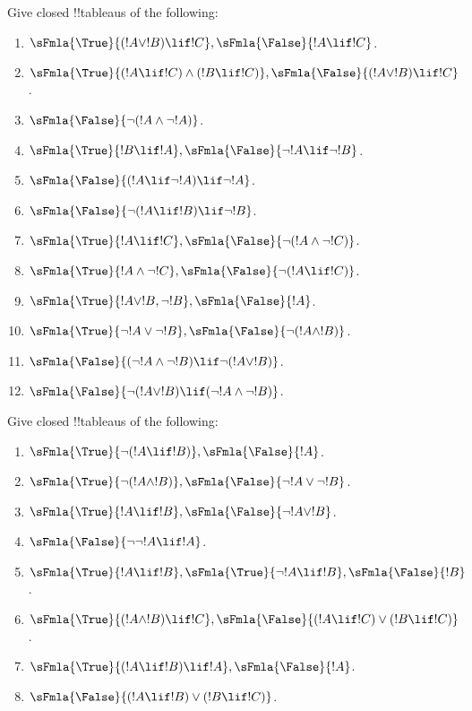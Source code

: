 \documentclass[../../../include/open-logic-section]{subfiles}
\begin{document}
\begin{prob}
Give closed !!{tableau}s of the following:
\begin{enumerate}
\item $\sFmla{\True}{(!A \lor !B) \lif !C}, \sFmla{\False}{!A \lif !C}$.
\item $\sFmla{\True}{(!A \lif !C) \land (!B \lif !C)}, \sFmla{\False}{(!A \lor !B) \lif !C}$.
\item $\sFmla{\False}{\lnot(!A \land \lnot !A)}$.
\item $\sFmla{\True}{!B \lif !A}, \sFmla{\False}{\lnot !A \lif \lnot !B}$.
\item $\sFmla{\False}{(!A \lif \lnot !A) \lif \lnot !A}$.
\item $\sFmla{\False}{\lnot(!A \lif !B) \lif \lnot !B}$.
\item $\sFmla{\True}{!A \lif !C}, \sFmla{\False}{\lnot (!A \land \lnot !C)}$.
\item $\sFmla{\True}{!A \land \lnot !C}, \sFmla{\False}{\lnot (!A \lif !C)}$.
\item $\sFmla{\True}{!A \lor !B, \lnot !B}, \sFmla{\False}{!A}$.
\item $\sFmla{\True}{\lnot !A \lor \lnot !B}, \sFmla{\False}{\lnot(!A \land !B)}$.
\item $\sFmla{\False}{(\lnot !A \land \lnot !B) \lif\lnot(!A \lor !B)}$.
\item $\sFmla{\False}{\lnot(!A \lor !B) \lif (\lnot !A \land \lnot !B)}$.
\end{enumerate}
\end{prob}

\begin{prob}
Give closed !!{tableau}s of the following:
\begin{enumerate}
\item $\sFmla{\True}{\lnot(!A \lif !B)}, \sFmla{\False}{!A}$.
\item $\sFmla{\True}{\lnot(!A \land !B)}, \sFmla{\False}{\lnot !A \lor \lnot !B}$.
\item $\sFmla{\True}{!A \lif !B}, \sFmla{\False}{\lnot !A \lor !B}$.
\item $\sFmla{\False}{\lnot \lnot !A \lif !A}$.
\item $\sFmla{\True}{!A \lif !B}, \sFmla{\True}{\lnot !A \lif !B}, \sFmla{\False}{!B}$.
\item $\sFmla{\True}{(!A \land !B) \lif !C}, \sFmla{\False}{(!A \lif !C) \lor (!B \lif !C)}$.
\item $\sFmla{\True}{(!A \lif !B) \lif !A}, \sFmla{\False}{!A}$.
\item $\sFmla{\False}{(!A \lif !B) \lor (!B \lif !C)}$.
\end{enumerate}
\end{prob}
\end{document}
